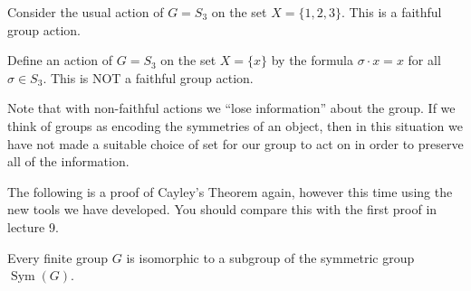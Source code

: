 \begin{example}
    Consider the usual action of $G=S_3$ on the set $X=\{1,2,3\}$. This is a faithful group action.

    Define an action of $G=S_3$ on the set $X=\{x\}$ by the formula $\sigma \cdot x=x$ for all $\sigma \in S_3$. This is NOT a faithful group action.
\end{example}

\begin{remark}
    Note that with non-faithful actions we ``lose information'' about the group. If we think of groups as encoding the symmetries of an object, then in this situation we have not made a suitable choice of set for our group to act on in order to preserve all of the information.
    


\end{remark}

The following is a proof of Cayley's Theorem again, however this time using the new tools we have developed. You should compare this with the first proof in lecture 9.

\begin{theorem}
    Every finite group $G$ is isomorphic to a subgroup of the symmetric group $\operatorname{Sym}(G)$.
\end{theorem}


